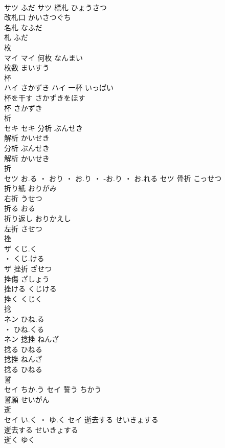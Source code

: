 \documentclass[8pt]{extreport}
\begin{document}
\begin{CJK}{UTF8}{min}
\\	サツ	ふだ	サツ	標札	ひょうさつ	
\\	改札口	かいさつぐち	
\\	名札	なふだ	
\\	札	ふだ	
\\	枚	
\\	マイ		マイ	何枚	なんまい	
\\	枚数	まいすう	
\\	杯	
\\	ハイ	さかずき	ハイ	一杯	いっぱい	
\\	杯を干す	さかずきをほす	
\\	杯	さかずき	
\\	析	
\\	セキ		セキ	分析	ぶんせき	
\\	解析	かいせき	
\\	分析	ぶんせき	
\\	解析	かいせき	
\\	折	
\\	セツ	お.る ・ おり ・ お.り ・ -お.り ・ お.れる	セツ	骨折	こっせつ	
\\	折り紙	おりがみ	
\\	右折	うせつ	
\\	折る	おる	
\\	折り返し	おりかえし	
\\	左折	させつ	
\\	挫	
\\	ザ	くじ.く
\\	・ くじ.ける
\\	ザ	挫折	ざせつ	
\\	挫傷	ざしょう	
\\	挫ける	くじける	
\\	挫く	くじく	
\\	捻	
\\	ネン	ひね.る
\\	・ ひね.くる
\\	ネン	捻挫	ねんざ	
\\	捻る	ひねる	
\\	捻挫	ねんざ	
\\	捻る	ひねる	
\\	誓	
\\	セイ	ちか.う	セイ	誓う	ちかう	
\\	誓願	せいがん	
\\	逝	
\\	セイ	い.く ・ ゆ.く	セイ	逝去する	せいきょする	
\\	逝去する	せいきょする	
\\	逝く	ゆく	

\end{CJK}
\end{document}
